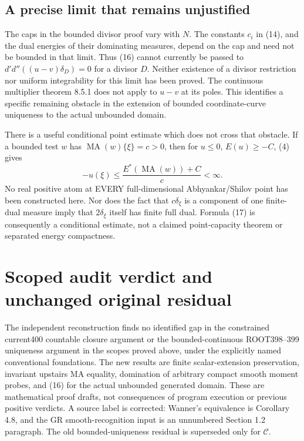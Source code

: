 \documentclass[11pt]{article}
\newcommand{\C}{\mathcal C}
\newcommand{\MA}{\operatorname{MA}}
\begin{document}
\subsection{A precise limit that remains unjustified}
The caps in the bounded divisor proof vary with $N$. The constants $c_i$ in
(14), and the dual energies of their dominating measures, depend on the cap
and need not be bounded in that limit. Thus (16) cannot currently be passed
to $d'd''((u-v)\delta_D)=0$ for a divisor $D$. Neither existence of a divisor
restriction nor uniform integrability for this limit has been proved.
The continuous multiplier theorem 8.5.1 does not apply to $u-v$ at its poles.
This identifies a specific remaining obstacle in the extension of bounded
coordinate-curve uniqueness to the actual unbounded domain.

There is a useful conditional point estimate which does not cross that obstacle.
If a bounded test $w$ has $\MA(w)\{\xi\}=c>0$, then for $u\le0$,
$E(u)\ge-C$, (4) gives
\[
 -u(\xi)\le\frac{E^*(\MA(w))+C}{c}<\infty.                \tag{17}
\]
No real positive atom at EVERY full-dimensional Abhyankar/Shilov point has
been constructed here. Nor does the fact that $c\delta_\xi$ is a component
of one finite-dual measure imply that $2\delta_\xi$ itself has finite full
dual. Formula (17) is consequently a conditional estimate, not a claimed
point-capacity theorem or separated energy compactness.
\section{Scoped audit verdict and unchanged original residual}
The independent reconstruction finds no identified gap in the constrained
current400 countable closure argument or the bounded-continuous
ROOT398--399 uniqueness argument
in the scopes proved above, under the explicitly named conventional foundations.
The new results are finite scalar-extension preservation, invariant upstairs
MA equality, domination of arbitrary compact smooth moment probes, and (16)
for the actual unbounded generated domain. These are mathematical proof drafts,
not consequences of program execution or previous positive verdicts.
A source label is corrected: Wanner's equivalence is Corollary 4.8, and the
GR smooth-recognition input is an unnumbered Section 1.2 paragraph.
The old bounded-uniqueness residual is superseded only for $\C$.
\end{document}
